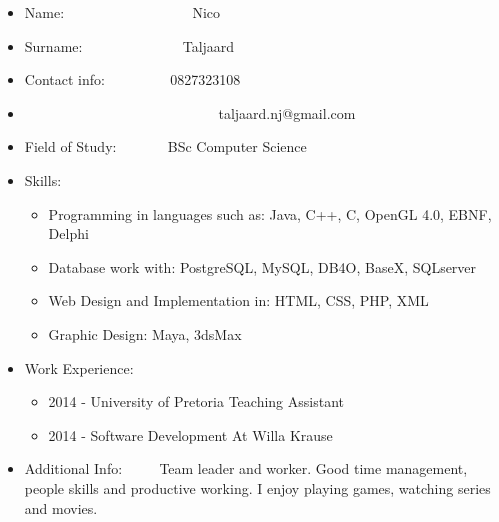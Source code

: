 \documentclass[12pt]{article}
\begin{document}
\begin{itemize}
	\item Name: \ ~~~~~~~~~~~~~~~ \ Nico
	\item Surname: \ ~~~~~~~~~~~ \ Taljaard
	\item Contact info: \ ~~~~~~ \ 0827323108 
	\item \ ~~~~~~~~~~~~~~~~~~~~~~~~~ \ taljaard.nj@gmail.com
	\item Field of Study: \ ~~~~ \ BSc Computer Science
	\item Skills: \begin{itemize}
					\item Programming in languages such as: Java, C++, C, OpenGL 4.0, EBNF, Delphi
					\item Database work with: PostgreSQL, MySQL, DB4O, BaseX, SQLserver
					\item Web Design and Implementation in: HTML, CSS, PHP, XML
					\item Graphic Design: Maya, 3dsMax
				  \end{itemize}
	\item Work Experience: \begin{itemize}
								\item 2014 - University of Pretoria Teaching Assistant
								\item 2014 - Software Development At Willa Krause
							\end{itemize}
	\item Additional Info: \ ~~ \ Team leader and worker. Good time management, people skills and productive working. I enjoy playing games, watching series and movies.
	
\end{itemize}
\end{document}

